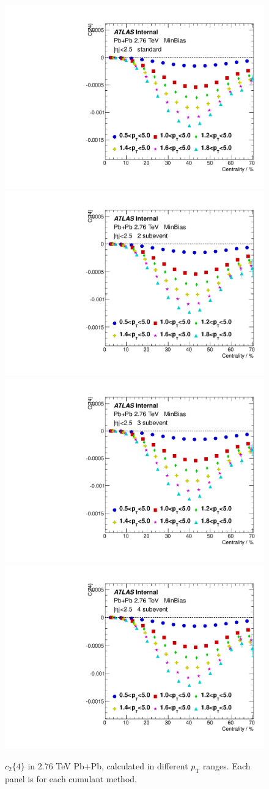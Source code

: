 \begin{figure}[H]
\centering
\includegraphics[width=.245\linewidth]{figs/sec_appendix/PbPb276/PbPb276_pT_1sub_Har2.pdf}
\includegraphics[width=.245\linewidth]{figs/sec_appendix/PbPb276/PbPb276_pT_2sub_Har2.pdf}
\includegraphics[width=.245\linewidth]{figs/sec_appendix/PbPb276/PbPb276_pT_3sub_Har2.pdf}
\includegraphics[width=.245\linewidth]{figs/sec_appendix/PbPb276/PbPb276_pT_4sub_Har2.pdf}
\caption{$c_2\{4\}$ in 2.76 TeV Pb+Pb, calculated in different $p_\text{T}$ ranges. Each panel is for each cumulant method.}
\label{fig:PbPb276_pT_v2}
\end{figure}

